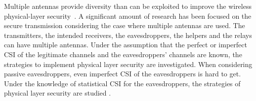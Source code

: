 \documentclass[12pt,journal,draftclsnofoot,onecolumn]{IEEEtran}
\begin{document}
Multiple antennas provide diversity than can be exploited to improve the wireless physical-layer
security~\cite{zou_improving_2015}. A significant amount of research has been focused on the secure transmission considering the case where multiple antennas are used. The transmitters, the intended receivers, the eavesdroppers, the helpers and the relays can have multiple antennas. Under the assumption that the perfect or imperfect CSI of the legitimate channels and the eavesdroppers' channels are known\cite{6584932,wang2013secure,cumanan2014secrecy,jayasinghe2014secure}, the strategies to implement physical layer security are investigated. When considering passive eavesdroppers, even imperfect CSI of the eavesdroppers is hard to get. Under the knowledge of statistical CSI for the eavesdroppers, the strategies of physical layer security are studied \cite{yang2013transmit,wang2013secure,hui2015secure,tsai2014power,chen2015large,pei_adaptive_2014}. 

\end{document}
